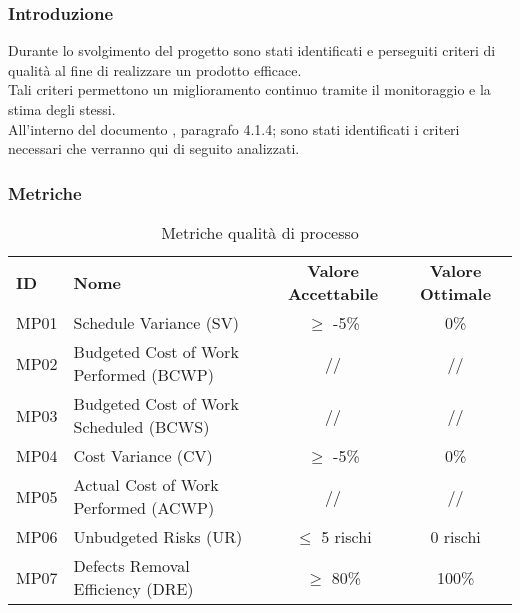

\subsubsection{Introduzione}
Durante lo svolgimento del progetto sono stati identificati e perseguiti criteri di qualità al fine di realizzare un prodotto efficace. \\
Tali criteri permettono un miglioramento continuo tramite il monitoraggio e la stima degli stessi.\\
All'interno del documento , paragrafo 4.1.4; sono stati identificati i criteri necessari che verranno qui di seguito analizzati.
\subsubsection{Metriche}

\begin{table} [h!]
	\begin{center}
		\begin{tabular} {m{2 cm} m{7 cm} c c }
			\rowcolor{lightgray}
			\textbf{ID} & \textbf{Nome}& \textbf{Valore Accettabile} & \textbf{Valore Ottimale}\\
			MP01 & Schedule Variance (SV)   & $\geq$ -5\%    & 0\% \\
			MP02 & Budgeted Cost of Work Performed (BCWP) & //           & // \\
			MP03 & Budgeted Cost of Work Scheduled (BCWS) & //           & // \\
			MP04 & Cost Variance (CV)   & $\geq$ -5\% & 0\% \\
			MP05 & Actual Cost of Work Performed (ACWP) & //           & // \\
			MP06 & Unbudgeted Risks (UR)   & $\leq$ 5 rischi & 0 rischi\\
			MP07 & Defects Removal Efficiency (DRE)  & $\geq$  80\% & 100\%\\

		\end{tabular}
	\caption{Metriche qualità di processo}
	\end{center}
\end{table}
